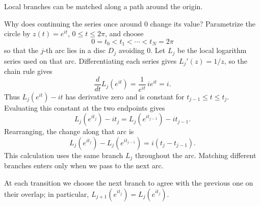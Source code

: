 \documentclass[11pt]{article}
\theoremstyle{plain}
\theoremstyle{definition}
\theoremstyle{remark}
\numberwithin{equation}{section}
\newenvironment{lecturefigure}
 {\par\addvspace{0.25em}\begingroup\setlength{\parskip}{0pt}\centering}
 {\par\endgroup\addvspace{0.25em}}
\begin{document}
\begin{lecturefigure}

{\small Local branches can be matched along a path around the origin.}
\end{lecturefigure}
Why does continuing the series once around $0$ change its value?
Parametrize the circle by $z(t)=e^{it}$, $0\leq t\leq2\pi$, and choose
\[
 0=t_0<t_1<\cdots<t_N=2\pi
\]
so that the $j$-th arc lies in a disc $D_j$ avoiding $0$. Let $L_j$ be
the local logarithm series used on that arc. Differentiating each series gives
$L_j'(z)=1/z$, so the chain rule gives
\[
 \frac{d}{dt}L_j(e^{it})=\frac{1}{e^{it}}\,ie^{it}=i.
\]
Thus $L_j(e^{it})-it$ has derivative zero and is constant for
$t_{j-1}\leq t\leq t_j$. Evaluating this constant at the two endpoints
gives
\[
 L_j(e^{it_j})-it_j
 =L_j(e^{it_{j-1}})-it_{j-1}.
\]
Rearranging, the change along that arc is
\[
 L_j(e^{it_j})-L_j(e^{it_{j-1}})=i(t_j-t_{j-1}).
\]
This calculation uses the same branch $L_j$ throughout the arc.
Matching different branches enters only when we pass to the next arc.

At each transition we choose the next branch to agree with the previous
one on their overlap; in particular,
$L_{j+1}(e^{it_j})=L_j(e^{it_j})$.
\end{document}
